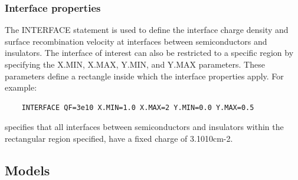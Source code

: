 \documentclass[11pt]{article}
\begin{document}
\subsubsection{Interface properties}
The INTERFACE statement is used to define the interface charge density and surface recombination velocity at interfaces between semiconductors and insulators. The interface of interest can also be restricted to a specific region by specifying the X.MIN, X.MAX, Y.MIN, and Y.MAX parameters. These parameters define a rectangle inside which the interface properties apply. For example:
\begin{verbatim}
    INTERFACE QF=3e10 X.MIN=1.0 X.MAX=2 Y.MIN=0.0 Y.MAX=0.5
\end{verbatim}
specifies that all interfaces between semiconductors and insulators within the rectangular region specified, have a fixed charge of 3.1010cm-2.

\subsection{Models}


\end{document}

